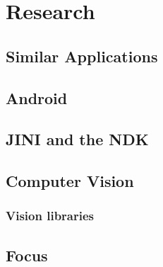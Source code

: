 \chapter{Research}

\section{Similar Applications}

\section{Android}

\section{JINI and the NDK}

\section{Computer Vision}

\subsection{Vision libraries}

\section{Focus}
